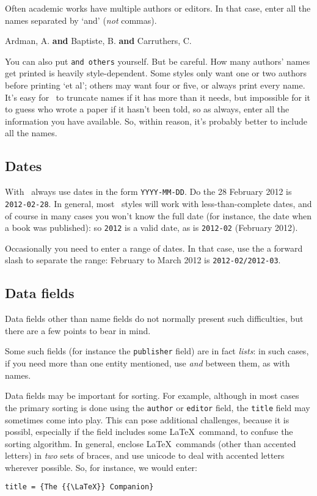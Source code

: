 {Often academic works have multiple authors or editors. In that case, enter all the names separated by `and' (\emph{not} commas).
\begin{center}
\ttfamily
Ardman, A. \textbf{and} Baptiste, B. \textbf{and} Carruthers, C.
\end{center}

You can also put \verb|and others| yourself. But be careful. How many authors' names get printed is heavily style-dependent. Some styles only want one or two authors before printing `et al'; others may want four or five, or always print every name. It's easy for \biblatex\ to truncate names if it has more than it needs, but impossible for it to guess who wrote a paper if it hasn't been told, so as always, enter all the information you have available. So, within reason, it's probably better to include all the names.

\subsection{Dates}

With \biblatex\ always use dates in the form \verb|YYYY-MM-DD|. Do the 28 February 2012 is \verb|2012-02-28|. In general, most \biblatex\ styles will work with less-than-complete dates, and of course in many cases you won't know the full date (for instance, the date when a book was published): so \verb|2012| is a valid date, as is \verb|2012-02| (February 2012).

Occasionally you need to enter a range of dates. In that case, use the a forward slash to separate the range: February to March 2012 is \verb|2012-02/2012-03|.

\subsection{Data fields}

Data fields other than name fields do not normally present such difficulties, but there are a few points to bear in mind.

Some such fields (for instance the \verb|publisher| field) are in fact \emph{lists}: in such cases, if you need more than one entity mentioned, use \emph{and} between them, as with names.

Data fields may be important for sorting. For example, although in most cases the primary sorting is done using the \verb|author| or \verb|editor| field, the \verb|title| field may sometimes come into play. This can pose additional challenges, because it is possibl, especially if the field includes some \LaTeX\ command, to confuse the sorting algorithm. In general, enclose \LaTeX\ commands (other than accented letters) in \emph{two} sets of braces, and use unicode to deal with accented letters wherever possible. So, for instance, we would enter:
\begin{center}
\verb|title = {The {{\LaTeX}} Companion}|


\end{center}}
